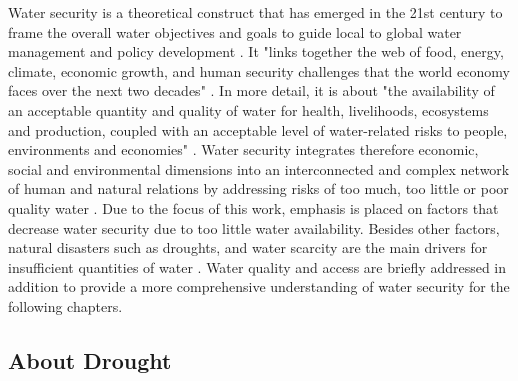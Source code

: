 Water security is a theoretical construct that has emerged in the 21st century to frame the overall water objectives and goals to guide local to global water management and policy development \autocite{sadoffWaterSecurity2020}. It "links together the web of food, energy, climate, economic growth, and human security challenges that the world economy faces over the next two decades" \autocite[5]{wefBubbleCloseBursting2009}. In more detail, it is about "the availability of an acceptable quantity and quality of water for health, livelihoods, ecosystems and production, coupled with an acceptable level of water-related risks to people, environments and economies" \autocite[1]{greySinkSwimWater2007}.\newline
Water security integrates therefore economic, social and environmental dimensions into an interconnected and complex network of human and natural relations by addressing risks of too much, too little or poor quality water \autocite{vanbeekWaterSecurityPutting2014, mishraWaterSecurityChanging2021}. Due to the focus of this work, emphasis is placed on factors that decrease water security due to too little water availability. Besides other factors, natural disasters such as droughts, and water scarcity are the main drivers for insufficient quantities of water \autocite{caretta2022water}. Water quality and access are briefly addressed in addition to provide a more comprehensive understanding of water security for the following chapters.

\subsection{About Drought}\label{subsec:about_drought}

